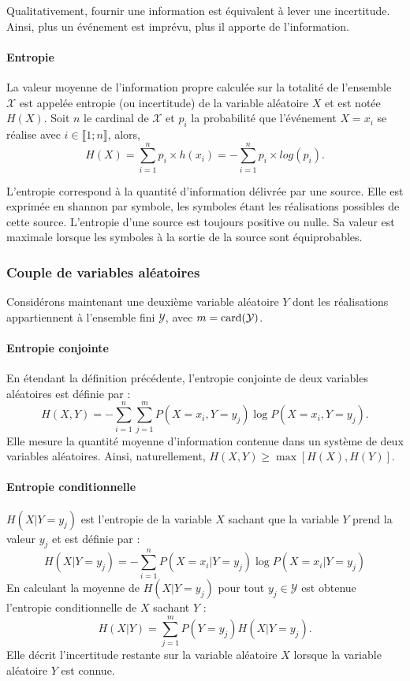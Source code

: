 Qualitativement, fournir une information est équivalent à lever une incertitude. Ainsi, plus un événement est imprévu, 
plus il apporte de l'information.

\paragraph*{Entropie}
La valeur moyenne de l'information propre calculée sur la totalité de l'ensemble $\mathcal{X}$ est appelée entropie (ou 
incertitude) de la variable aléatoire $X$ et est notée $H(X)$. Soit $n$ le cardinal de $\mathcal{X}$ et $p_i$ la 
probabilité que l'événement $X=x_i$ se réalise avec $i\in \llbracket 1; n\rrbracket$, alors, 
\[H(X) = \sum\limits_{i=1}^n p_i\times h(x_i) = - \sum\limits_{i=1}^n p_i\times log(p_i).\]

L'entropie correspond à la quantité d'information délivrée par une source. Elle est exprimée en shannon 
par symbole, les symboles étant les réalisations possibles de cette source. L'entropie d'une source est toujours positive
ou nulle. Sa valeur est maximale lorsque les symboles à la sortie de la source sont équiprobables.

\subsubsection{Couple de variables aléatoires}
Considérons maintenant une deuxième variable aléatoire $Y$ dont les réalisations appartiennent à l'ensemble fini $\mathcal{Y}$, avec 
$m=\operatorname{card}(\mathcal{Y})$.
\paragraph*{Entropie conjointe}
En étendant la définition précédente, l'entropie conjointe de deux variables aléatoires est définie par : 
\[H(X, Y) = - \sum\limits_{i=1}^n\sum\limits_{j=1}^m P(X=x_i, Y=y_j) \log P(X=x_i, Y=y_j).\]
Elle mesure la quantité moyenne d'information contenue dans un système de deux variables aléatoires. 
Ainsi, naturellement, $H(X, Y) \geq \max \left[H(X), H(Y)\right]$.
\paragraph*{Entropie conditionnelle} 
$H(X|Y=y_j)$ est l'entropie de la variable $X$ sachant que la variable $Y$ prend la valeur $y_j$ et est définie par :
\[H(X|Y=y_j) = - \sum \limits_{i=1}^n P(X=x_i|Y=y_j)\log P(X=x_i|Y=y_j)\]
En calculant la moyenne de $H(X|Y=y_j)$ pour tout $y_j\in \mathcal{Y}$ est obtenue l'entropie conditionnelle de $X$ sachant $Y$ : 
\[H(X|Y) = \sum\limits_{j=1}^m P(Y=y_j) H(X|Y=y_j).\] Elle décrit l'incertitude restante sur la variable aléatoire $X$ 
lorsque la variable aléatoire $Y$ est connue.
